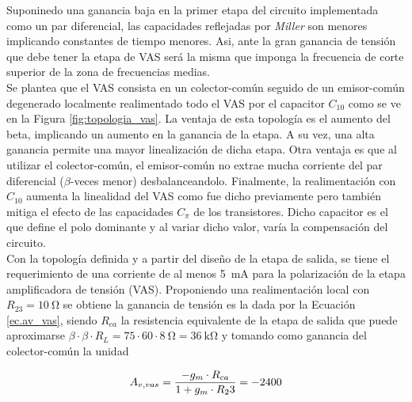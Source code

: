 	Suponinedo una ganancia baja en la primer etapa del circuito implementada como un par diferencial, las capacidades reflejadas por \emph{Miller} son menores implicando constantes de tiempo menores. Asi, ante la gran ganancia de tensión que debe tener la etapa de VAS será la misma que imponga la frecuencia de corte superior de la zona de frecuencias medias.\\
	\indent Se plantea que el VAS consista en un colector-común seguido de un emisor-común degenerado localmente realimentado todo el VAS por el capacitor $C_{10}$ como se ve en la Figura \ref{fig:topologia_vas}. La ventaja de esta topología es el aumento del beta, implicando un aumento en la ganancia de la etapa. A su vez, una alta ganancia permite una mayor linealización de dicha etapa. Otra ventaja es que al utilizar el colector-común, el emisor-común no extrae mucha corriente del par diferencial ($\beta$-veces menor) desbalanceandolo. Finalmente, la realimentación con $C_{10}$ aumenta la linealidad del VAS como fue dicho previamente pero también mitiga el efecto de las capacidades $C_{\pi}$ de los transistores. Dicho capacitor es el que define el polo dominante y al variar dicho valor, varía la compensación del circuito.\\

	Con la topología definida y a partir del diseño de la etapa de salida, se tiene el requerimiento de una corriente de al menos \SI{5}{\milli\ampere} para la polarización de la etapa amplificadora de tensión (VAS). Proponiendo una realimentación local con $R_23 = \SI{10}{\ohm}$ se obtiene la ganancia de tensión es la dada por la Ecuación \eqref{ec.av_vas}, siendo $R_{ca}$ la resistencia equivalente de la etapa de salida que puede aproximarse $\beta \cdot \beta \cdot R_L = 75 \cdot 60 \cdot \SI{8}{\ohm} = \SI{36}{\kilo\ohm}$ y tomando como ganancia del colector-común la unidad

\begin{equation}
	\centering
	A_{v,vas} = \frac{-g_m \cdot R_{ca}}{1+g_m \cdot R_23} = -2400
	\label{ec.av_vas}
\end{equation}
	
